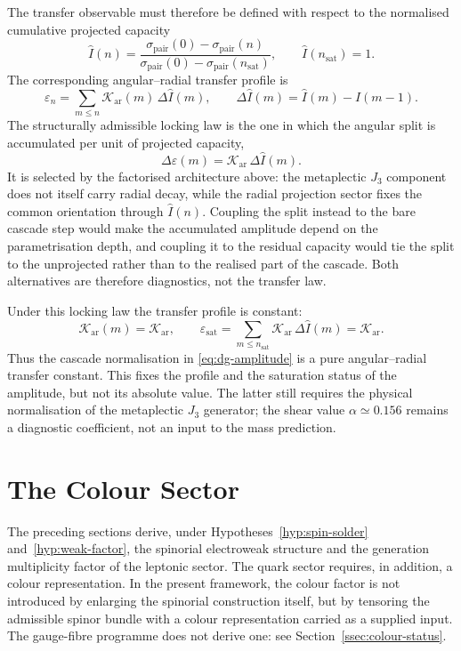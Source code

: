 \documentclass[11pt,a4paper]{article}
\theoremstyle{definition}
\theoremstyle{remark}
\begin{document}
    The transfer observable must therefore be defined with respect to the normalised cumulative
    projected capacity
    \[
      \widehat{I}(n)
      =
      \frac{\sigma_{\mathrm{pair}}(0) - \sigma_{\mathrm{pair}}(n)}
      {\sigma_{\mathrm{pair}}(0) - \sigma_{\mathrm{pair}}(n_{\mathrm{sat}})} ,
      \qquad
      \widehat{I}(n_{\mathrm{sat}}) = 1 .
    \]
    The corresponding angular--radial transfer profile is
    \[
      \varepsilon_n
      =
      \sum_{m \le n} \mathcal{K}_{\mathrm{ar}}(m)\, \Delta\widehat{I}(m),
      \qquad
      \Delta\widehat{I}(m) = \widehat{I}(m) - \widehat{I}(m-1) .
    \]
    The structurally admissible locking law is the one in which the angular split is accumulated per
    unit of projected capacity,
    \[
      \Delta\varepsilon(m) = \mathcal{K}_{\mathrm{ar}}\, \Delta\widehat{I}(m) .
    \]
    It is selected by the factorised architecture above: the metaplectic $J_3$ component does not
    itself carry radial decay, while the radial projection sector fixes the common orientation
    through $\widehat{I}(n)$.
    Coupling the split instead to the bare cascade step would make the accumulated amplitude depend
    on the parametrisation depth, and coupling it to the residual capacity would tie the split to the
    unprojected rather than to the realised part of the cascade.
    Both alternatives are therefore diagnostics, not the transfer law.

    Under this locking law the transfer profile is constant:
    \[
      \mathcal{K}_{\mathrm{ar}}(m) = \mathcal{K}_{\mathrm{ar}},
      \qquad
      \varepsilon_{\mathrm{sat}}
      =
      \sum_{m \le n_{\mathrm{sat}}} \mathcal{K}_{\mathrm{ar}}\, \Delta\widehat{I}(m)
      =
      \mathcal{K}_{\mathrm{ar}} .
    \]
    Thus the cascade normalisation in \eqref{eq:dg-amplitude} is a pure angular--radial transfer
    constant.
    This fixes the profile and the saturation status of the amplitude, but not its absolute value.
    The latter still requires the physical normalisation of the metaplectic $J_3$ generator; the
    shear value $\alpha \simeq 0.156$ remains a diagnostic coefficient, not an input to the mass
    prediction.


  \section{The Colour Sector}
  \label{sec:colour}

  The preceding sections derive, under Hypotheses~\ref{hyp:spin-solder} and~\ref{hyp:weak-factor}, the
  spinorial electroweak structure and the generation multiplicity factor of the leptonic sector.
  The quark sector requires, in addition, a colour representation.
  In the present framework, the colour factor is not introduced by enlarging the
  spinorial construction itself, but by tensoring the admissible spinor bundle with a colour
  representation carried as a supplied input.
  The gauge-fibre programme does not derive one: see Section~\ref{ssec:colour-status}.
\end{document}
